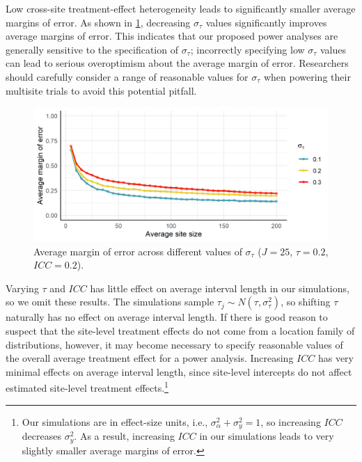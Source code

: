 \documentclass[]{article}
\begin{document}
Low cross-site treatment-effect heterogeneity leads to significantly smaller average margins of error.
As shown in \ref{fig:results_txsd}, decreasing $\sigma_\tau$ values significantly improves average margins of error.
This indicates that our proposed power analyses are generally sensitive to the specification of $\sigma_\tau$;
incorrectly specifying low $\sigma_\tau$ values can lead to serious overoptimism about the average margin of error.
Researchers should carefully consider a range of reasonable values for $\sigma_\tau$ when powering their multisite trials to avoid this potential pitfall.
\begin{figure}[ht]
	\centering
	\includegraphics[width=\textwidth]{simstudy_txsd_length}
	\caption{Average margin of error across different values of $\sigma_\tau$ ($J=25$, $\tau=0.2$, $ICC=0.2$).}
	\label{fig:results_txsd}
\end{figure}

Varying $\tau$ and $ICC$ has little effect on average interval length in our simulations, so we omit these results.
The simulations sample $\tau_j \sim N(\tau, \sigma_\tau^2)$, so shifting $\tau$ naturally has no effect on average interval length.
If there is good reason to suspect that the site-level treatment effects do not come from a location family of distributions, however, it may become necessary to specify reasonable values of the overall average treatment effect for a power analysis.
Increasing $ICC$ has very minimal effects on average interval length, since site-level intercepts do not affect estimated site-level treatment effects.\footnote{Our simulations are in effect-size units, i.e., $\sigma^2_\alpha + \sigma^2_y = 1$, so increasing $ICC$ decreases $\sigma^2_y$.
As a result, increasing $ICC$ in our simulations leads to very slightly smaller average margins of error.}
\end{document}
